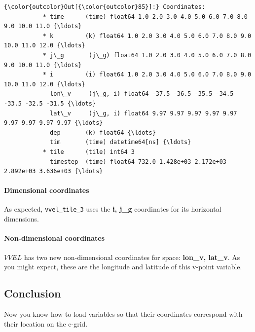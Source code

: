 \documentclass[11pt]{article}
\begin{document}
\begin{Verbatim}[commandchars=\\\{\}]
{\color{outcolor}Out[{\color{outcolor}85}]:} Coordinates:
           * time      (time) float64 1.0 2.0 3.0 4.0 5.0 6.0 7.0 8.0 9.0 10.0 11.0 {\ldots}
           * k         (k) float64 1.0 2.0 3.0 4.0 5.0 6.0 7.0 8.0 9.0 10.0 11.0 12.0 {\ldots}
           * j\_g       (j\_g) float64 1.0 2.0 3.0 4.0 5.0 6.0 7.0 8.0 9.0 10.0 11.0 {\ldots}
           * i         (i) float64 1.0 2.0 3.0 4.0 5.0 6.0 7.0 8.0 9.0 10.0 11.0 12.0 {\ldots}
             lon\_v     (j\_g, i) float64 -37.5 -36.5 -35.5 -34.5 -33.5 -32.5 -31.5 {\ldots}
             lat\_v     (j\_g, i) float64 9.97 9.97 9.97 9.97 9.97 9.97 9.97 9.97 9.97 {\ldots}
             dep       (k) float64 {\ldots}
             tim       (time) datetime64[ns] {\ldots}
           * tile      (tile) int64 3
             timestep  (time) float64 732.0 1.428e+03 2.172e+03 2.892e+03 3.636e+03 {\ldots}
\end{Verbatim}
            
    \paragraph{Dimensional coordinates}\label{dimensional-coordinates}

As expected, \texttt{vvel\_tile\_3} uses the \textbf{i, j\_g}
coordinates for its horizontal dimensions.

\paragraph{Non-dimensional
coordinates}\label{non-dimensional-coordinates}

\(VVEL\) has two new non-dimensional coordinates for space:
\textbf{lon\_v, lat\_v}. As you might expect, these are the longitude
and latitude of this v-point variable.

    \subsection{Conclusion}\label{conclusion}

Now you know how to load variables so that their coordinates correspond
with their location on the c-grid.


    
    
    
    
\end{document}
